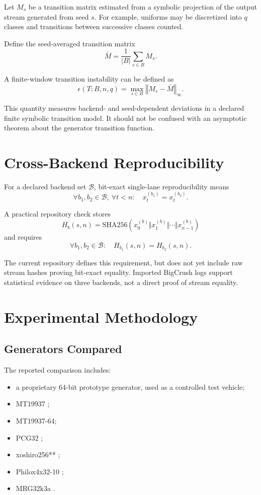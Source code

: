 \documentclass[11pt,a4paper]{article}
\begin{document}
Let $M_s$ be a transition matrix estimated from a symbolic projection of the output stream generated from seed $s$. For example, uniforms may be discretized into $q$ classes and transitions between successive classes counted.

Define the seed-averaged transition matrix
\[
\bar M = \frac{1}{|B|}\sum_{s\in B} M_s.
\]

A finite-window transition instability can be defined as
\[
\epsilon(T;B,n,q)
  =
  \max_{s\in B} \left\Vert M_s-\bar M \right\Vert_{\infty}.
\]

This quantity measures backend- and seed-dependent deviations in a declared finite symbolic transition model. It should not be confused with an asymptotic theorem about the generator transition function.

\section{Cross-Backend Reproducibility}

For a declared backend set $\mathcal{B}$, bit-exact single-lane reproducibility means
\[
\forall b_1,b_2\in\mathcal{B},\ \forall t<n:\quad
x_t^{(b_1)} = x_t^{(b_2)}.
\]

A practical repository check stores
\[
H_b(s,n)=\mathrm{SHA256}(x_0^{(b)}\Vert x_1^{(b)}\Vert\cdots\Vert x_{n-1}^{(b)})
\]
and requires
\[
\forall b_1,b_2\in\mathcal{B}:\quad H_{b_1}(s,n)=H_{b_2}(s,n).
\]

The current repository defines this requirement, but does not yet include raw stream hashes proving bit-exact equality. Imported BigCrush logs support statistical evidence on three backends, not a direct proof of stream equality.

\section{Experimental Methodology}

\subsection{Generators Compared}

The reported comparison includes:

\begin{itemize}[nosep]
  \item a proprietary 64-bit prototype generator, used as a controlled test vehicle;
  \item MT19937 \cite{matsumoto1998mersenne};
  \item MT19937-64;
  \item PCG32 \cite{oneill2014pcg};
  \item xoshiro256** \cite{vigna2017scramblings};
  \item Philox4x32-10 \cite{salmon2011parallel};
  \item MRG32k3a \cite{lecuyer1999mrg}.
\end{itemize}
\end{document}
